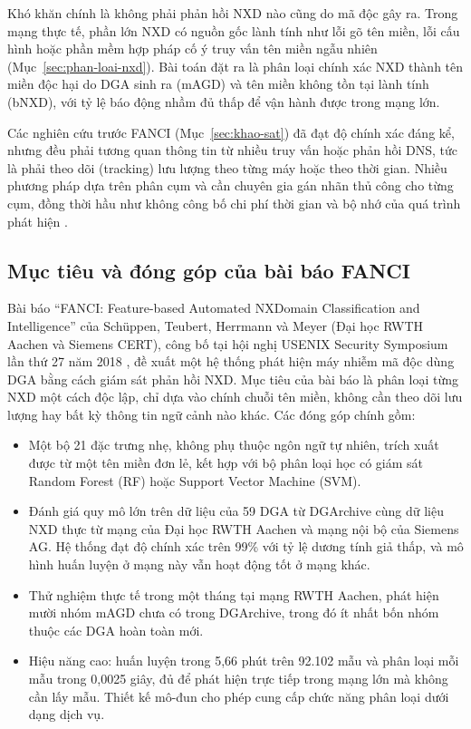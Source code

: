 Khó khăn chính là không phải phản hồi NXD nào cũng do mã độc gây ra. Trong mạng thực tế, phần lớn NXD có nguồn gốc lành tính như lỗi gõ tên miền, lỗi cấu hình hoặc phần mềm hợp pháp cố ý truy vấn tên miền ngẫu nhiên (Mục~\ref{sec:phan-loai-nxd}). Bài toán đặt ra là phân loại chính xác NXD thành tên miền độc hại do DGA sinh ra (mAGD) và tên miền không tồn tại lành tính (bNXD), với tỷ lệ báo động nhầm đủ thấp để vận hành được trong mạng lớn.

Các nghiên cứu trước FANCI (Mục~\ref{sec:khao-sat}) đã đạt độ chính xác đáng kể, nhưng đều phải tương quan thông tin từ nhiều truy vấn hoặc phản hồi DNS, tức là phải theo dõi (tracking) lưu lượng theo từng máy hoặc theo thời gian. Nhiều phương pháp dựa trên phân cụm và cần chuyên gia gán nhãn thủ công cho từng cụm, đồng thời hầu như không công bố chi phí thời gian và bộ nhớ của quá trình phát hiện \cite{schuppen2018fanci}.

\subsection{Mục tiêu và đóng góp của bài báo FANCI}\label{sec:muc-tieu-bai-bao}

Bài báo ``FANCI: Feature-based Automated NXDomain Classification and Intelligence'' của Schüppen, Teubert, Herrmann và Meyer (Đại học RWTH Aachen và Siemens CERT), công bố tại hội nghị USENIX Security Symposium lần thứ 27 năm 2018 \cite{schuppen2018fanci}, đề xuất một hệ thống phát hiện máy nhiễm mã độc dùng DGA bằng cách giám sát phản hồi NXD. Mục tiêu của bài báo là phân loại từng NXD một cách độc lập, chỉ dựa vào chính chuỗi tên miền, không cần theo dõi lưu lượng hay bất kỳ thông tin ngữ cảnh nào khác. Các đóng góp chính gồm:
\begin{itemize}
    \item Một bộ 21 đặc trưng nhẹ, không phụ thuộc ngôn ngữ tự nhiên, trích xuất được từ một tên miền đơn lẻ, kết hợp với bộ phân loại học có giám sát Random Forest (RF) hoặc Support Vector Machine (SVM).
    \item Đánh giá quy mô lớn trên dữ liệu của 59 DGA từ DGArchive cùng dữ liệu NXD thực từ mạng của Đại học RWTH Aachen và mạng nội bộ của Siemens AG. Hệ thống đạt độ chính xác trên 99\% với tỷ lệ dương tính giả thấp, và mô hình huấn luyện ở mạng này vẫn hoạt động tốt ở mạng khác.
    \item Thử nghiệm thực tế trong một tháng tại mạng RWTH Aachen, phát hiện mười nhóm mAGD chưa có trong DGArchive, trong đó ít nhất bốn nhóm thuộc các DGA hoàn toàn mới.
    \item Hiệu năng cao: huấn luyện trong 5,66 phút trên 92.102 mẫu và phân loại mỗi mẫu trong 0,0025 giây, đủ để phát hiện trực tiếp trong mạng lớn mà không cần lấy mẫu. Thiết kế mô-đun cho phép cung cấp chức năng phân loại dưới dạng dịch vụ.
\end{itemize}

